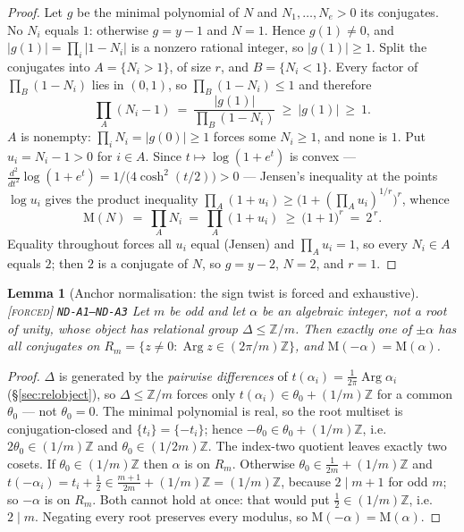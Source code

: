 \documentclass[11pt]{article}
\newcommand{\tagF}{\textcolor{cF}{\textsc{[forced]}}}
\newcommand{\hx}[1]{\textcolor{cC}{\footnotesize\texttt{#1}}}
\newcommand{\Z}{\mathbb{Z}}
\newcommand{\M}{\mathrm{M}}
\DeclareMathOperator{\Arg}{Arg}
\theoremstyle{plain}
\newtheorem{lemma}[theorem]{Lemma}
\theoremstyle{definition}
\theoremstyle{remark}
\begin{document}
\begin{proof}
Let $g$ be the minimal polynomial of $N$ and $N_1,\dots,N_e>0$ its conjugates.
No $N_i$ equals $1$: otherwise $g=y-1$ and $N=1$. Hence $g(1)\neq0$, and
$|g(1)|=\prod_i|1-N_i|$ is a nonzero rational integer, so $|g(1)|\ge1$. Split
the conjugates into $A=\{N_i>1\}$, of size $r$, and $B=\{N_i<1\}$. Every factor
of $\prod_{B}(1-N_i)$ lies in $(0,1)$, so $\prod_{B}(1-N_i)\le1$ and therefore
\[
\prod_{A}(N_i-1)\ =\ \frac{|g(1)|}{\prod_{B}(1-N_i)}\ \ge\ |g(1)|\ \ge\ 1 .
\]
$A$ is nonempty: $\prod_iN_i=|g(0)|\ge1$ forces some $N_i\ge1$, and none is $1$.
Put $u_i=N_i-1>0$ for $i\in A$. Since $t\mapsto\log(1+e^{t})$ is convex ---
$\tfrac{d^2}{dt^2}\log(1+e^{t})=1/\bigl(4\cosh^2(t/2)\bigr)>0$ --- Jensen's
inequality at the points $\log u_i$ gives the product inequality
$\prod_{A}(1+u_i)\ge\bigl(1+(\prod_{A}u_i)^{1/r}\bigr)^{r}$, whence
\[
\M(N)\ =\ \prod_{A}N_i\ =\ \prod_{A}(1+u_i)\ \ge\ \bigl(1+1\bigr)^{r}\ =\ 2^{\,r}.
\]
Equality throughout forces all $u_i$ equal (Jensen) and $\prod_Au_i=1$, so every
$N_i\in A$ equals $2$; then $2$ is a conjugate of $N$, so $g=y-2$, $N=2$, and
$r=1$.
\end{proof}

\begin{lemma}[Anchor normalisation: the sign twist is forced and exhaustive]\label{lem:anchor}\tagF{} \hx{ND-A1--ND-A3}
Let $m$ be odd and let $\alpha$ be an algebraic integer, not a root of unity,
whose object has relational group $\Delta\le\Z/m$. Then \emph{exactly one} of
$\pm\alpha$ has all conjugates on $R_m=\{z\neq0:\Arg z\in(2\pi/m)\Z\}$, and
$\M(-\alpha)=\M(\alpha)$.
\end{lemma}

\begin{proof}
$\Delta$ is generated by the \emph{pairwise differences} of
$t(\alpha_i)=\tfrac1{2\pi}\Arg\alpha_i$ (\S\ref{sec:relobject}), so
$\Delta\le\Z/m$ forces only $t(\alpha_i)\in\theta_0+(1/m)\Z$ for a common
$\theta_0$ --- not $\theta_0=0$. The minimal polynomial is real, so the root
multiset is conjugation-closed and $\{t_i\}=\{-t_i\}$; hence
$-\theta_0\in\theta_0+(1/m)\Z$, i.e.\ $2\theta_0\in(1/m)\Z$ and
$\theta_0\in(1/2m)\Z$. The index-two quotient leaves exactly two cosets. If
$\theta_0\in(1/m)\Z$ then $\alpha$ is on $R_m$. Otherwise
$\theta_0\in\tfrac1{2m}+(1/m)\Z$ and
$t(-\alpha_i)=t_i+\tfrac12\in\tfrac{m+1}{2m}+(1/m)\Z=(1/m)\Z$, because $2\mid
m+1$ for odd $m$; so $-\alpha$ is on $R_m$. Both cannot hold at once: that would
put $\tfrac12\in(1/m)\Z$, i.e.\ $2\mid m$. Negating every root preserves every
modulus, so $\M(-\alpha)=\M(\alpha)$.
\end{proof}
\end{document}
